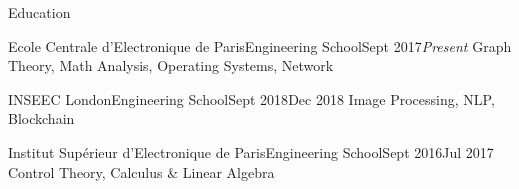 \documentclass{resume}
\begin{document}
    \begin{rSection}{Education}
        \begin{school}{Ecole Centrale d'Electronique de Paris}{Engineering School}{Sept 2017}{\em Present}{
            Graph Theory, Math Analysis, Operating Systems, Network
        }
        \end{school}

        \begin{school}{INSEEC London}{Engineering School}{Sept 2018}{Dec 2018}{
            Image Processing, NLP, Blockchain
        }
        \end{school}

        \begin{school}{Institut Supérieur d'Electronique de Paris}{Engineering School}{Sept 2016}{Jul 2017}{
            Control Theory, Calculus \& Linear Algebra
        }
        \end{school}
    \end{rSection}
\end{document}
